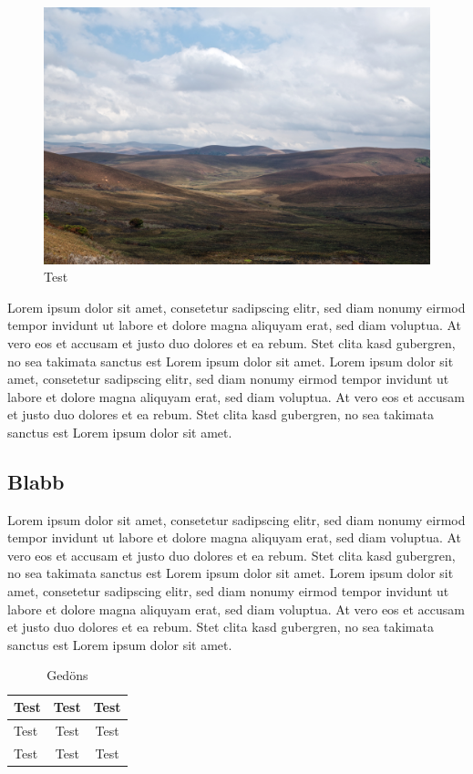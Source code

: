 \documentclass[twoside]{scrreprt}
\begin{document}
\begin{figure}[htbp]
  \includegraphics[width=\textwidth]{Nyika}
  \caption{Test}
\end{figure}


Lorem ipsum dolor sit amet, consetetur sadipscing elitr, sed diam nonumy eirmod tempor invidunt ut labore et dolore magna aliquyam erat, sed diam voluptua. At vero eos et accusam et justo duo dolores et ea rebum. Stet clita kasd gubergren, no sea takimata sanctus est Lorem ipsum dolor sit amet. Lorem ipsum dolor sit amet, consetetur sadipscing elitr, sed diam nonumy eirmod tempor invidunt ut labore et dolore magna aliquyam erat, sed diam voluptua. At vero eos et accusam et justo duo dolores et ea rebum. Stet clita kasd gubergren, no sea takimata sanctus est Lorem ipsum dolor sit amet.

\subsection{Blabb}
Lorem ipsum dolor sit amet, consetetur sadipscing elitr, sed diam nonumy eirmod tempor invidunt ut labore et dolore magna aliquyam erat, sed diam voluptua. At vero eos et accusam et justo duo dolores et ea rebum. Stet clita kasd gubergren, no sea takimata sanctus est Lorem ipsum dolor sit amet. Lorem ipsum dolor sit amet, consetetur sadipscing elitr, sed diam nonumy eirmod tempor invidunt ut labore et dolore magna aliquyam erat, sed diam voluptua. At vero eos et accusam et justo duo dolores et ea rebum. Stet clita kasd gubergren, no sea takimata sanctus est Lorem ipsum dolor sit amet.

\begin{table}[htbp]
  \begin{tabular}[c]{|l|cc|}
  	\hline
    Test & Test & Test\\
    \hline
    Test &     Test     & Test \\
    Test&Test&Test \\
    \hline
  \end{tabular}
  \caption{Gedöns}
\end{table}
\end{document}
